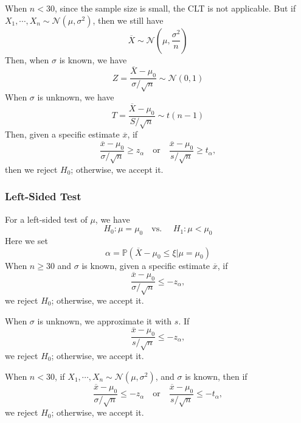 When \(n < 30\), since the sample size is small, the CLT is not applicable. But if \(X_1, \cdots, X_n \sim \mathcal{N}(\mu, \sigma^2)\), then we still have 
\[
  \overline{X} \sim \mathcal{N} \left( \mu, \frac{\sigma^2}{n} \right)
\]
Then, when \(\sigma\) is known, we have 
\[
  Z = \dfrac{\overline{X} - \mu_0}{\sigma / \sqrt{n}} \sim \mathcal{N}(0, 1)
\]
When \(\sigma\) is unknown, we have 
\[
  T = \dfrac{\overline{X} - \mu_0}{S / \sqrt{n}} \sim t(n - 1)
\]
Then, given a specific estimate \(\overline{x}\), if 
\[
  \frac{\overline{x} - \mu_0}{\sigma / \sqrt{n}} \geq z_{\alpha}
\quad \text{or} \quad
  \frac{\overline{x} - \mu_0}{s / \sqrt{n}} \geq t_{\alpha},
\]
then we reject \(H_0\); otherwise, we accept it.

\subsubsection{Left-Sided Test}
For a left-sided test of \(\mu\), we have 
\[
  H_0: \mu = \mu_0 \quad \text{vs. } \quad H_1: \mu < \mu_0
\]
Here we set
\[
  \alpha = \mathbb{P} (\overline{X} - \mu_0 \leq \xi \vert \mu = \mu_0)
\]
When \(n \geq 30\) and \(\sigma\) is known, given a specific estimate \(\overline{x}\), if 
\[
  \frac{\overline{x} - \mu_0}{\sigma / \sqrt{n}} \leq -z_{\alpha}, 
\]
we reject \(H_0\); otherwise, we accept it.

When \(\sigma\) is unknown, we approximate it with \(s\). If 
\[
  \frac{\overline{x} - \mu_0}{s / \sqrt{n}} \leq -z_{\alpha},
\]
we reject \(H_0\); otherwise, we accept it.

When \(n < 30\), if \(X_1, \cdots, X_n \sim \mathcal{N}(\mu, \sigma^2)\), and \(\sigma\) is known, then if 
\[
  \frac{\overline{x} - \mu_0}{\sigma / \sqrt{n}} \leq -z_{\alpha}
\quad \text{or} \quad
  \frac{\overline{x} - \mu_0}{s / \sqrt{n}} \leq -t_{\alpha},
\]
we reject \(H_0\); otherwise, we accept it.


